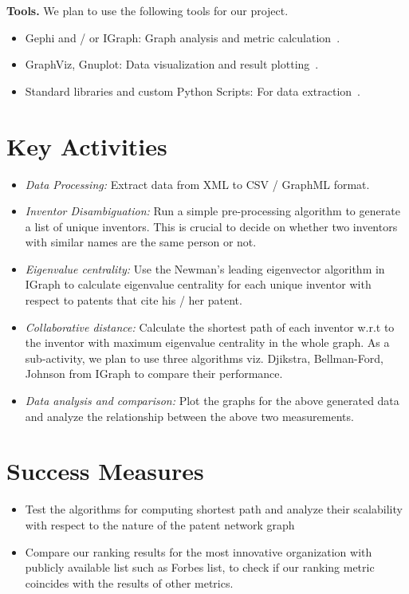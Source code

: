 \documentclass[11pt]{article}
\renewcommand{\paragraph}{\vspace{3pt}\noindent\textbf}
\newcommand{\squish}{
  \setlength{\topsep}{0pt}
  \setlength{\itemsep}{0ex}
  \setlength{\parskip}{0pt}
}
\begin{document}
\paragraph{Tools.}
We plan to use the following tools for our project.
\begin{itemize}
\item Gephi and / or IGraph: Graph analysis and metric calculation~\cite{gephi, igraph}.
\item GraphViz, Gnuplot: Data visualization and result plotting~\cite{graphviz, gnuplot}.
\item Standard libraries and custom Python Scripts: For data extraction~\cite{python}.
\end{itemize}

\section{Key Activities}
\begin{itemize}
\item {\em Data Processing:} Extract data from XML to CSV / GraphML format.
\item {\em Inventor Disambiguation:} Run a simple pre-processing algorithm to generate a list of unique inventors.  This is crucial to decide on whether two inventors with similar names are the same person or not.
\item {\em Eigenvalue centrality:} Use the Newman's leading eigenvector algorithm in IGraph to calculate eigenvalue centrality for each unique inventor with respect to patents that cite his / her patent.
\item {\em Collaborative distance:} Calculate the shortest path of each inventor w.r.t to the inventor with maximum eigenvalue centrality in the whole graph. As a sub-activity, we plan to use three algorithms viz. Djikstra, Bellman-Ford, Johnson from IGraph to compare their performance.
\item {\em Data analysis and comparison:} Plot the graphs for the above generated data and analyze the relationship between the above two measurements.
\end{itemize}

\section{Success Measures} %
\begin{itemize}
\item Test the algorithms for computing shortest path and analyze their scalability with respect to the nature of the patent network graph
\item Compare our ranking results for the most innovative organization with publicly available list such as Forbes list, to check if our ranking metric coincides with the results of other metrics.
\end{itemize}
\end{document}
